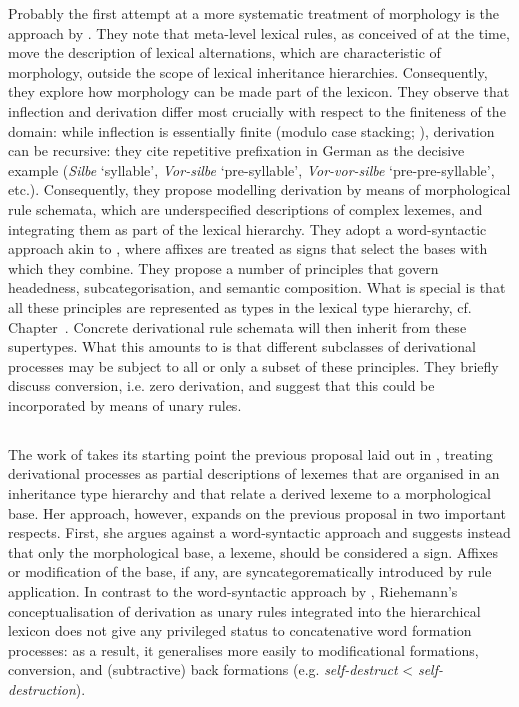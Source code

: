 \documentclass[output=paper
	        ,collection
	        ,collectionchapter
 	        ,biblatex
                ,babelshorthands
                ,newtxmath
                ,draftmode
                ,colorlinks, citecolor=brown
]{langscibook}
\begin{document}
Probably the first attempt at a more systematic treatment of
morphology is the approach by \citet{Krieger:Nerbonne:93}. They note
that meta-level lexical rules, as conceived of at the time, move the
description of lexical alternations, which are characteristic of
morphology, outside the scope of lexical inheritance
hierarchies. Consequently, they explore how morphology can be made
part of the lexicon. They observe that inflection and derivation
differ most crucially with respect to the finiteness of the domain:
while inflection is essentially finite (modulo case stacking;
\citealp{Sadler06,malouf:head-driven}), derivation can be recursive:
they cite repetitive prefixation in German as the decisive example
(\textit{Silbe} `syllable', \textit{Vor-silbe} `pre-syllable',
\textit{Vor-vor-silbe} `pre-pre-syllable', etc.). Consequently, they
propose  modelling derivation by means of morphological rule schemata,
which are underspecified descriptions of complex lexemes, and
integrating them as part of the lexical hierarchy. They adopt a
word-syntactic approach akin to \citet{Lieber92}, where affixes are
treated as signs that select the bases with which they combine. They
propose a number of principles that govern headedness,
subcategorisation, and semantic composition. What is special is that
all these principles are represented as types in the lexical type
hierarchy, cf. Chapter~. Concrete
derivational rule schemata will then inherit from these
supertypes. What this amounts to is that different subclasses of
derivational processes may be subject to all or only a subset of these
principles. They briefly discuss conversion, i.e. zero derivation, and
suggest that this could be incorporated by means of unary rules.



\subsection{\protect\citet{Riehemann98}}

The work of \citet{Riehemann98} takes its starting point the
previous proposal laid out in \citet{Krieger:Nerbonne:93}, treating
derivational processes as partial descriptions of lexemes that are
organised in an inheritance type hierarchy and that relate a derived
lexeme to a morphological base.  Her approach, however, expands on the
previous proposal in two important respects. First, she argues against
a word-syntactic approach and suggests instead that only the
morphological base, a lexeme, should be considered a sign. Affixes or
modification of the base, if any, are syncategorematically introduced
by rule application. In contrast to the word-syntactic approach by
\citet{Krieger:Nerbonne:93}, Riehemann's conceptualisation of
derivation as unary rules integrated into the hierarchical lexicon
does not give any privileged status to concatenative word formation
processes: as a result, it generalises more easily to modificational
formations, conversion, and  (subtractive) back formations
(e.g. \textit{self-destruct} < \textit{self-destruction}). 
\end{document}
